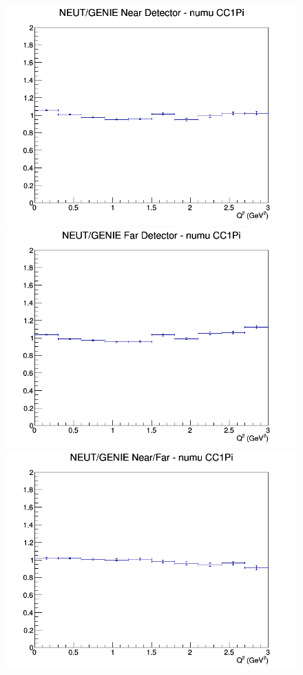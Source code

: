 \begin{figure}[h]
\endminipage
\newline
{}
\includegraphics[width=\linewidth]{Q2/nominal/ratios/CC1Pi_NEUT_GENIE_numu_near_Q2.png}
\endminipage
{}
\includegraphics[width=\linewidth]{Q2/nominal/ratios/CC1Pi_NEUT_GENIE_numu_far_Q2.png}
\endminipage
{}
\includegraphics[width=\linewidth]{Q2/nominal/ratios/CC1Pi_NEUT_GENIE_numu_NF_Q2.png}

\end{figure}
